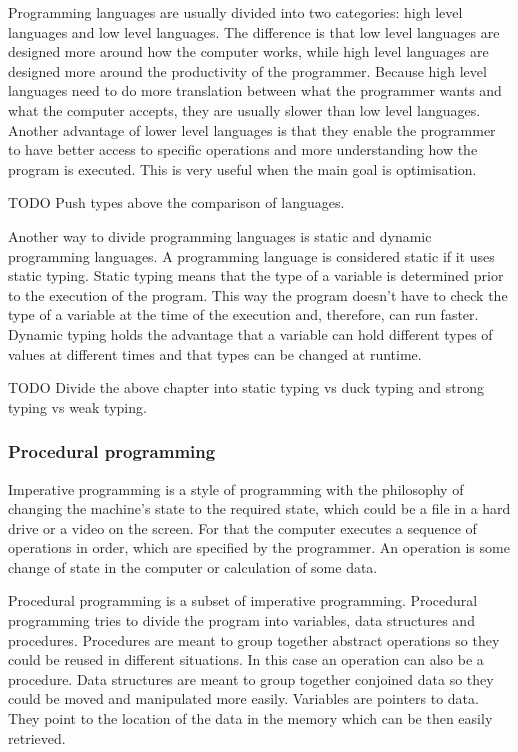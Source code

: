 Programming languages are usually divided into two categories: high level
languages and low level languages. The difference is that low level languages
are designed more around how the computer works, while high level languages are
designed more around the productivity of the programmer. Because high level
languages need to do more translation between what the programmer wants and what
the computer accepts, they are usually slower than low level languages. Another
advantage of lower level languages is that they enable the programmer to have
better access to specific operations and more understanding how the program is
executed. This is very useful when the main goal is
optimisation.\cite{website:scripting-languages}

TODO Push types above the comparison of languages.

Another way to divide programming languages is static and dynamic programming
languages. A programming language is considered static if it uses static typing.
Static typing means that the type of a variable is determined prior to the
execution of the program. This way the program doesn't have to check the type of
a variable at the time of the execution and, therefore, can run faster. Dynamic
typing holds the advantage that a variable can hold different types of values at
different times and that types can be changed at runtime.\cite{website:types}

TODO Divide the above chapter  into static typing vs duck typing and strong
typing vs weak typing.

\subsubsection{Procedural programming}
Imperative programming is a style of programming with the philosophy of changing the machine's state to the required state, which could be a file in a hard drive or a video on the screen. For that the computer executes a sequence of operations in order, which are specified by the programmer. An operation is some change of state in the computer or calculation of some data.

Procedural programming is a subset of imperative programming. Procedural programming tries to divide the program into variables, data structures and procedures. Procedures are meant to group together abstract operations so they could be reused in different situations. In this case an operation can also be a procedure. Data structures are meant to group together conjoined data so they could be moved and manipulated more easily. Variables are pointers to data. They point to the location of the data in the memory which can be then easily retrieved.

